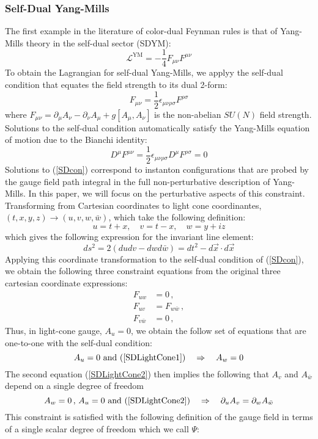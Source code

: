 \documentclass[11pt,letter]{article}
\def\eqn#1{(\ref{#1})}
\def\be{\begin{equation}}
\def\ee{\end{equation}}
\begin{document}
\subsubsection{Self-Dual Yang-Mills} The first example in the literature \cite{} of color-dual Feynman rules is that of Yang-Mills theory in the self-dual sector (SDYM):
\be
\mathcal{L}^{\text{YM}} = -\frac{1}{4}F_{\mu\nu}F^{\mu\nu}
\ee
To obtain the Lagrangian for self-dual Yang-Mills, we applyy the self-dual condition that equates the field strength to its dual 2-form:
\be\label{SDcon}
F_{\mu\nu} = \frac{1}{2} \epsilon_{\mu\nu\rho\sigma}F^{\rho\sigma}
\ee
where $F_{\mu\nu} = \partial_\mu A_\nu -\partial_\nu A_\mu + g[A_\mu ,A_\nu]$ is the non-abelian $SU(N)$ field strength. Solutions to the self-dual condition automatically satisfy the Yang-Mills equation of motion due to the Bianchi identity:
\be
D^\mu F^{\mu\nu} = \frac{1}{2} \epsilon_{\mu\nu\rho\sigma}D^\mu F^{\rho\sigma} = 0
\ee
Solutions to \eqn{SDcon} correspond to instanton configurations that are probed by the gauge field path integral in the full non-perturbative description of Yang-Mills. In this paper, we will focus on the perturbative aspects of this constraint. Transforming from Cartesian coordinates to light cone coordinantes, $(t,x,y,z) \rightarrow (u,v,w,\bar{w})$, which take the following definition:
\be
u = t+x,\quad v=t-x, \quad w = y+iz
\ee
which gives the following expression for the invariant line element:
\be
ds^2 = 2(dudv - dwd\bar{w}) = dt^2 - d\vec{x}\cdot d\vec{x}
\ee
Applying this coordinate transformation to the self-dual condition of \eqn{SDcon}, we obtain the following three constraint equations from the original three cartesian coordinate expressions:
\begin{align} \label{SDLightCone1}
F_{uw} &=0\,,
\\
 \label{SDLightCone2}
 F_{uv} &= F_{w\bar{w}}\,,
\\
 \label{SDLightCone3}
 F_{v\bar{w}} &= 0\,,
\end{align}
Thus, in light-cone gauge, $A_u=0$, we obtain the follow set of equations that are one-to-one with the self-dual condition:
\be
A_u=0 \text{ and } \eqn{SDLightCone1} \quad\Rightarrow \quad A_w=0
\ee
The second equation \eqn{SDLightCone2}  then implies the following that $A_v$ and $A_{\bar{w}}$ depend on a single degree of freedom
\be
A_w=0\,,\,A_u=0 \text{ and }\eqn{SDLightCone2} \quad\Rightarrow \quad \partial_u A_v = \partial_w A_{\bar{w}}
\ee
This constraint is  satisfied with the following definition of the gauge field in terms of a single scalar degree of freedom which we call $\Psi$:
\end{document}
